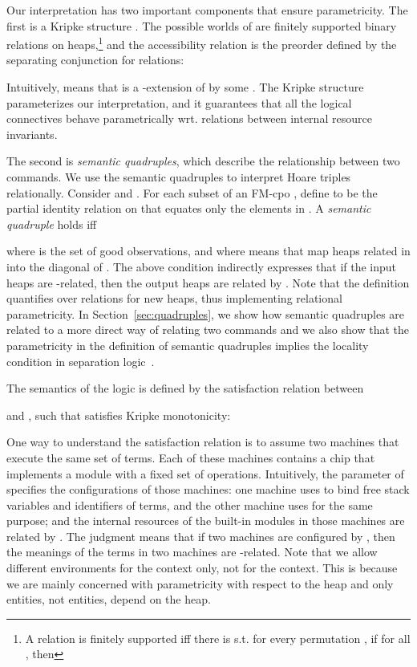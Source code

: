 \documentclass{LMCS}
\begin{document}
Our interpretation has two important components 
that ensure parametricity. The first is 
a Kripke structure . The possible
worlds of  are finitely supported binary 
relations  on heaps,\footnote{A relation  is 
finitely supported iff there is  
 s.t.
for every permutation , if  for all 
,
then
} 
and the accessibility relation is
the preorder defined by the separating conjunction for relations: 

Intuitively,  means that 
is a -extension of  by some . The Kripke structure  
parameterizes our interpretation, and it guarantees 
that all the logical connectives behave parametrically wrt. relations
between internal resource invariants. 

The second is {\em semantic quadruples}, which describe
the relationship between two commands. We use
the semantic quadruples to interpret Hoare triples relationally.
Consider 
and . 
For each subset  of an FM-cpo ,
define  to be the partial identity relation on  that 
equates only the elements in . A {\em semantic quadruple\/} 
 holds iff

where  is the set  of good
observations, and where  means
that  map heaps related in  into the diagonal of .
The above condition 
indirectly expresses that if the input heaps  are 
-related, then the output 
heaps are related by . Note that the definition 
quantifies over relations  for new heaps, thus implementing
relational parametricity.  In Section~\ref{sec:quadruples},
we show how semantic quadruples are related to a more
direct way of relating two commands and we also show
that the parametricity in the definition of semantic quadruples
implies the locality condition in separation logic~\cite{reynolds02}.

The semantics of the logic is defined by the satisfaction relation 
 between

and ,
such that  satisfies Kripke monotonicity:
 
One way to understand the satisfaction relation is to
assume two machines that execute the same set of terms.
Each of these machines contains a chip that implements 
a module with a fixed set of operations. 
Intuitively, the
 parameter of 
specifies the configurations of those machines:
one machine uses  to bind free stack variables
and identifiers of terms, and the other machine uses 
for the same purpose; and the internal resources of the
built-in modules
in those machines are related by . The judgment 
means that if two machines are configured by ,
then the meanings of the terms in two machines
are -related. Note that 
we allow different environments for the  context only,
not for the  context. This is because we are mainly
concerned with parametricity with respect to the heap
and only  entities, not  entities, 
depend on the heap. 
\end{document}

